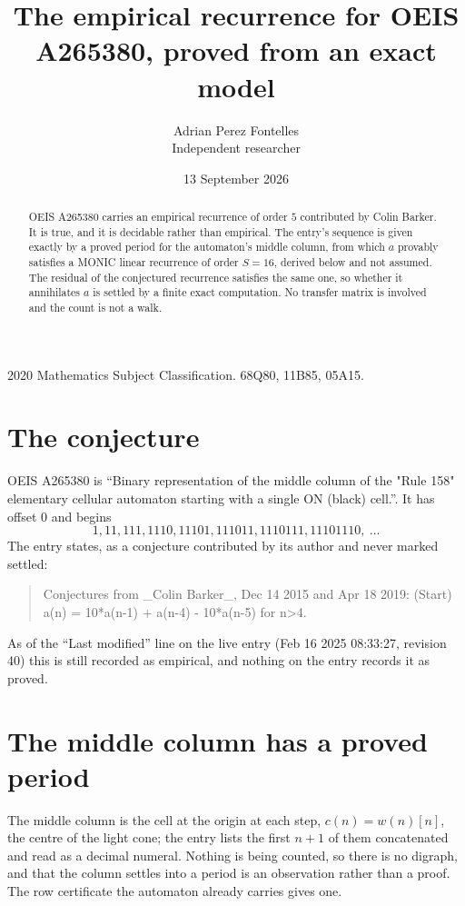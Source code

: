 \documentclass[11pt,a4paper]{article}
\title{The empirical recurrence for OEIS A265380, proved from an exact model}
\author{Adrian Perez Fontelles\\ \small Independent researcher}
\date{13 September 2026}
\theoremstyle{plain}
\theoremstyle{definition}
\begin{document}
\maketitle

\begin{abstract}
OEIS A265380 carries an empirical recurrence of order $5$ contributed by Colin Barker. It is true, and it is
decidable rather than empirical. The entry's sequence is given exactly by a proved period for the automaton's middle column, from
which $a$ provably satisfies a MONIC linear recurrence of order $S=16$, derived below and not
assumed. The residual of the conjectured recurrence satisfies the same one, so whether it
annihilates $a$ is settled by a finite exact computation. No transfer matrix is involved and
the count is not a walk.
\end{abstract}

\noindent\small 2020 Mathematics Subject Classification. 68Q80, 11B85, 05A15.\normalsize

\section{The conjecture}

OEIS A265380 is ``Binary representation of the middle column of the "Rule 158" elementary cellular automaton starting with a single ON (black) cell.''. It has offset $0$ and begins
\[
1, 11, 111, 1110, 11101, 111011, 1110111, 11101110,\ \dots
\]
The entry states, as a conjecture contributed by its author and never marked settled:
\begin{quote}
Conjectures from \_Colin Barker\_, Dec 14 2015 and Apr 18 2019: (Start) a(n) = 10*a(n-1) + a(n-4) - 10*a(n-5) for n>4.
\end{quote}
As of the ``Last modified'' line on the live entry (Feb 16 2025 08:33:27, revision 40)
this is still recorded as empirical, and nothing on the entry records it as proved.

\section{The middle column has a proved period}

The middle column is the cell at the origin at each step, $c(n)=w(n)[n]$, the centre of the
light cone; the entry lists the first $n+1$ of them concatenated and read as a decimal numeral. Nothing is being counted, so there is no digraph, and that
the column settles into a period is an observation rather than a proof. The row certificate the
automaton already carries gives one.
\end{document}
